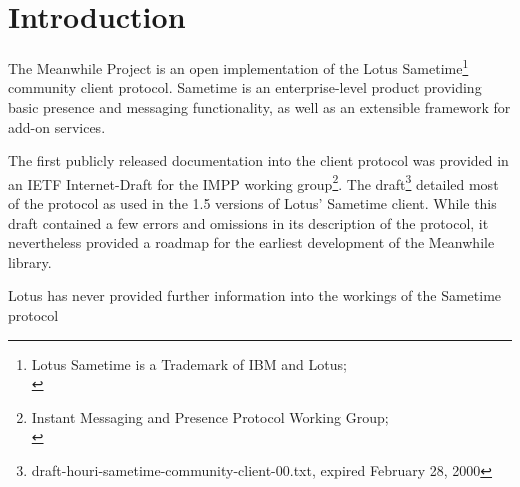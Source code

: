 

\chapter{Introduction}

\par{} The Meanwhile Project is an open implementation of the Lotus
Sametime\footnote[1]{Lotus Sametime is a Trademark of IBM and Lotus;\\
\sametimeLink} community client protocol. Sametime is an
enterprise-level product providing basic presence and messaging
functionality, as well as an extensible framework for add-on services.

\par{} The first publicly released documentation into the client
protocol was provided in an IETF Internet-Draft for the IMPP working
group\footnote[2]{Instant Messaging and Presence Protocol Working
Group;\\ \imppLink}. The
draft\footnote[3]{draft-houri-sametime-community-client-00.txt,
expired February 28, 2000} detailed most of the protocol as used in
the 1.5 versions of Lotus' Sametime client. While this draft contained
a few errors and omissions in its description of the protocol, it
nevertheless provided a roadmap for the earliest development of the
Meanwhile library.

\par{} Lotus has never provided further information into the workings
of the Sametime protocol
